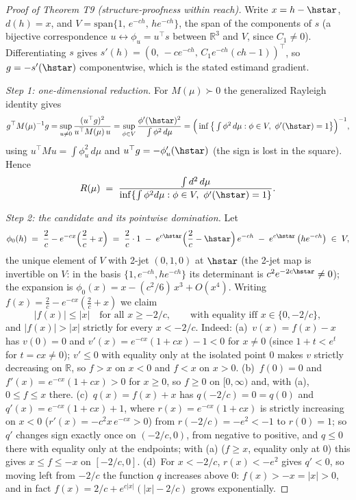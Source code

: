 \begin{proof}[Proof of Theorem T9 (structure-proofness within reach)]
Write $x = h - \hstar$, $d(h) = x$, and
$V = \mathrm{span}\{1,\, e^{-ch},\, h e^{-ch}\}$, the span of the
components of $s$ (a bijective correspondence $u \leftrightarrow
\phi_u = u^\top s$ between $\mathbb{R}^3$ and $V$, since $C_1 \neq 0$).
Differentiating $s$ gives
$s'(h) = (0,\, -c e^{-ch},\, C_1 e^{-ch}(ch - 1))^\top$, so
$g = -s'(\hstar)$ componentwise, which is the stated estimand gradient.

\emph{Step 1: one-dimensional reduction.} For $M(\mu) \succ 0$ the
generalized Rayleigh identity gives
\[
g^\top M(\mu)^{-1} g
 = \sup_{u \neq 0} \frac{(u^\top g)^2}{u^\top M(\mu)\, u}
 = \sup_{\phi \in V} \frac{\phi'(\hstar)^2}{\int \phi^2\, d\mu}
 = \Big(\inf\big\{ \textstyle\int \phi^2\, d\mu :
   \phi \in V,\ \phi'(\hstar) = 1 \big\}\Big)^{-1},
\]
using $u^\top M u = \int \phi_u^2\, d\mu$ and $u^\top g =
-\phi_u'(\hstar)$ (the sign is lost in the square). Hence
\[
R(\mu) \;=\; \frac{\int d^2\, d\mu}
{\inf\{\int \phi^2 d\mu : \phi \in V,\ \phi'(\hstar) = 1\}}.
\]

\emph{Step 2: the candidate and its pointwise domination.} Let
\[
\phi_0(h) \;=\; \frac{2}{c} - e^{-cx}\Big(\frac{2}{c} + x\Big)
 \;=\; \frac{2}{c}\cdot 1
 \;-\; e^{c\hstar}\Big(\frac{2}{c} - \hstar\Big)\, e^{-ch}
 \;-\; e^{c\hstar}\, \big(h e^{-ch}\big) \;\in\; V,
\]
the unique element of $V$ with 2-jet $(0, 1, 0)$ at $\hstar$ (the
2-jet map is invertible on $V$: in the basis $\{1, e^{-ch}, h e^{-ch}\}$
its determinant is $c^2 e^{-2c\hstar} \neq 0$); the expansion is
$\phi_0(x) = x - (c^2/6)\,x^3 + O(x^4)$. Writing
$f(x) = \tfrac{2}{c} - e^{-cx}(\tfrac{2}{c} + x)$ we claim
\[
|f(x)| \le |x| \quad \text{for all } x \ge -2/c,
\qquad \text{with equality iff } x \in \{0, -2/c\},
\]
and $|f(x)| > |x|$ strictly for every $x < -2/c$. Indeed:
(a)~$v(x) = f(x) - x$ has $v(0) = 0$ and
$v'(x) = e^{-cx}(1 + cx) - 1 < 0$ for $x \neq 0$ (since $1 + t < e^t$
for $t = cx \neq 0$); $v' \le 0$ with equality only at the isolated
point $0$ makes $v$ strictly decreasing on $\mathbb{R}$, so $f > x$ on
$x < 0$ and $f < x$ on $x > 0$.
(b)~$f(0) = 0$ and $f'(x) = e^{-cx}(1 + cx) > 0$ for $x \ge 0$, so
$f \ge 0$ on $[0, \infty)$ and, with (a), $0 \le f \le x$ there.
(c)~$q(x) = f(x) + x$ has $q(-2/c) = 0 = q(0)$ and
$q'(x) = e^{-cx}(1 + cx) + 1$, where $r(x) = e^{-cx}(1 + cx)$ is
strictly increasing on $x < 0$ ($r'(x) = -c^2 x\, e^{-cx} > 0$) from
$r(-2/c) = -e^2 < -1$ to $r(0) = 1$; so $q'$ changes sign exactly once
on $(-2/c, 0)$, from negative to positive, and $q \le 0$ there with
equality only at the endpoints; with (a) ($f \ge x$, equality only at
$0$) this gives $x \le f \le -x$ on $[-2/c, 0]$.
(d)~For $x < -2/c$, $r(x) < -e^2$ gives $q' < 0$, so moving left from
$-2/c$ the function $q$ increases above $0$: $f(x) > -x = |x| > 0$,
and in fact $f(x) = 2/c + e^{c|x|}(|x| - 2/c)$ grows exponentially.


\end{proof}
